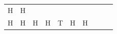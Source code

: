 {\begin{tabular}[t]{|l|l|l|l|l|l|l|l|l|l|}
        H &
    
    
        H%
     \tabularnewline\cline{1-1}\cline{2-2}\cline{3-3}\cline{4-4}\cline{5-5}\cline{6-6}\cline{7-7}\cline{8-8}\cline{9-9}\cline{10-10}
    
    
        H &
    
    
        H &
    
    
        H &
    
    
        H &
    
    
        T &
    
    
        H &
    
    
        H &
    

\end{tabular}}
